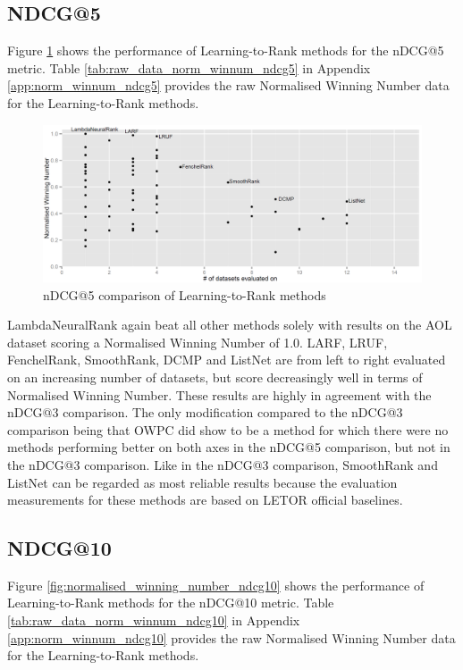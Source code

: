 \subsection{NDCG@5}
Figure \ref{fig:normalised_winning_number_ndcg5} shows the performance of Learning-to-Rank methods for the \ac{nDCG}@5 metric. Table \ref{tab:raw_data_norm_winnum_ndcg5} in Appendix \ref{app:norm_winnum_ndcg5} provides the raw Normalised Winning Number data for the Learning-to-Rank methods.\\

\begin{figure}[!h]
\includegraphics[scale=0.285]{gfx/ndcg5_winnum}
\caption{\acs{nDCG}@5 comparison of Learning-to-Rank methods}
\label{fig:normalised_winning_number_ndcg5}
\end{figure}

LambdaNeuralRank again beat all other methods solely with results on the AOL dataset scoring a Normalised Winning Number of 1.0. LARF, LRUF, FenchelRank, SmoothRank, DCMP and ListNet are from left to right evaluated on an increasing number of datasets, but score decreasingly well in terms of Normalised Winning Number. These results are highly in agreement with the \ac{nDCG}@3 comparison. The only modification compared to the \ac{nDCG}@3 comparison being that OWPC did show to be a method for which there were no methods performing better on both axes in the \ac{nDCG}@5 comparison, but not in the \ac{nDCG}@3 comparison. Like in the \ac{nDCG}@3 comparison, SmoothRank and ListNet can be regarded as most reliable results because the evaluation measurements for these methods are based on LETOR official baselines.

\subsection{NDCG@10}
Figure \ref{fig:normalised_winning_number_ndcg10} shows the performance of Learning-to-Rank methods for the \ac{nDCG}@10 metric. Table \ref{tab:raw_data_norm_winnum_ndcg10} in Appendix \ref{app:norm_winnum_ndcg10} provides the raw Normalised Winning Number data for the Learning-to-Rank methods.\\

